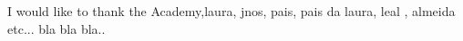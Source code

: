 
\begin{acknowledgments} 

I would like to thank the Academy,laura, jnos, pais, pais da laura, leal , almeida etc... bla bla bla..

\end{acknowledgments}
\clearpage
\thispagestyle{empty}
\cleardoublepage
